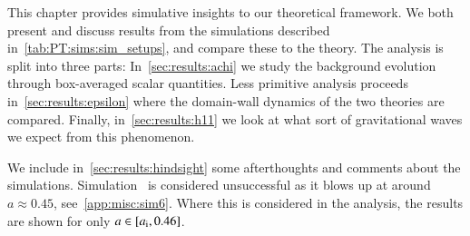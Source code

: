 


\newcommand{\lbl}[1]{\textsf{\textbf{#1}}}
\newcommand{\completelbl}[4]{%
\textbf{#1)}%
\textbf{#2:}%
\lbl{#3.#4}%
}
\newcommand{\lcoord}{\ALIASlcoord}
\newcommand{\lcoordx}{\ALIASlcoordx}
\newcommand{\lcoordk}{\ALIASlcoordk}
\newcommand{\epsA}{\ALIASepsA}
\newcommand{\epsB}{\ALIASepsB}
\newcommand{\epsC}{\ALIASepsC}
\newcommand{\wallsep}{\ALIASwallsep}









This chapter provides simulative insights to our theoretical framework. We both present and discuss results from the simulations described in~\cref{tab:PT:sims:sim_setups}, and compare these to the theory. The analysis is split into three parts: In~\cref{sec:results:achi} we study the background evolution through box-averaged scalar quantities. Less primitive analysis proceeds in~\cref{sec:results:epsilon} where the domain-wall dynamics of the two theories are compared. Finally, in~\cref{sec:results:h11} we look at what sort of gravitational waves we expect from this phenomenon. 

We include in~\cref{sec:results:hindsight} some afterthoughts and comments about the simulations. %
Simulation~ is considered unsuccessful as it blows up at around $a\approx 0.45$, see~\cref{app:misc:sim6}. Where this is considered in the analysis, the results are shown for only $a\in [a_\mathrm{i}, 0.46]$.







